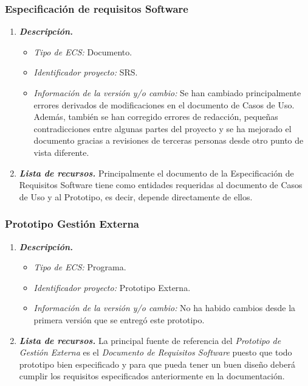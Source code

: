 \documentclass[11pt, a4paper, twoside, titlepage]{article}
\begin{document}
			\subsubsection{Especificación de requisitos Software}
				\begin{enumerate}
					\item {\itshape \bfseries Descripción.}
						\begin{itemize}
							\item \textit{Tipo de ECS:} Documento.
							\item \textit{Identificador proyecto:} SRS.
							\item \textit{Información de la versión y/o cambio:} Se han cambiado principalmente errores derivados de modificaciones en el documento de Casos de Uso. Además, también se han corregido errores de redacción, pequeñas contradicciones entre algunas partes del proyecto y se ha mejorado el documento gracias a revisiones de terceras personas desde otro punto de vista diferente.
						\end{itemize}

					\item {\itshape \bfseries Lista de recursos.}
						Principalmente el documento de la Especificación de Requisitos Software tiene como entidades requeridas al documento de Casos de Uso y al Prototipo, es decir, depende directamente de ellos.
				\end{enumerate}

			\subsubsection{Prototipo Gestión Externa}
			\begin{enumerate}
				\item {\itshape \bfseries Descripción.}
						\begin{itemize}
							\item \textit{Tipo de ECS:} Programa.
							\item \textit{Identificador proyecto:} Prototipo Externa.
							\item \textit{Información de la versión y/o cambio:} No ha habido cambios desde la primera versión que se entregó este prototipo.
						\end{itemize}

					\item {\itshape \bfseries Lista de recursos.}
						La principal fuente de referencia del \textit{Prototipo de Gestión Externa} es el \textit{Documento de Requisitos Software} puesto que todo prototipo bien especificado y para que pueda tener un buen diseño deberá cumplir los requisitos especificados anteriormente en la documentación.
				\end{enumerate}
\end{document}
